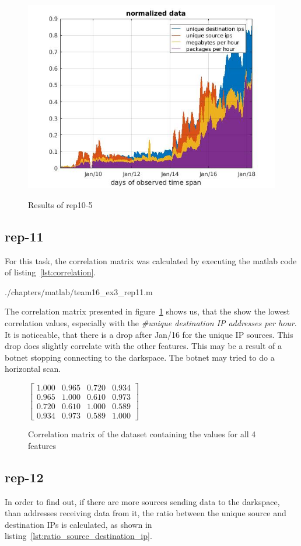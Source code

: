 \begin{figure}[H]
\center
\includegraphics[width=.5\textwidth]{./chapters/plots/rep10_5.jpg}\\
\caption{Results of rep10-5}
\end{figure}





\subsection*{rep-11}
For this task, the correlation matrix was calculated by executing the matlab code of listing~\ref{lst:correlation}.


				{./chapters/matlab/team16_ex3_rep11.m}

The correlation matrix presented in figure~\ref{fig:correlation} shows us, that the  show the lowest correlation values, especially with the \textit{\#unique destination IP addresses per hour}. It is noticeable, that there is a drop after Jan/16 for the unique IP sources. This drop does slightly correlate with the other features. This may be a result of a botnet stopping connecting to the darkspace. The botnet may tried to do a horizontal scan.

\begin{figure}[H]
\center
$
\begin{bmatrix}
1.000 &  0.965 &  0.720 &  0.934 \\
0.965 &  1.000 &  0.610 &  0.973 \\
0.720 &  0.610 &  1.000 &  0.589 \\
0.934 &  0.973 &  0.589 &  1.000
\end{bmatrix}
$
\caption{ Correlation matrix of the dataset containing the values for all 4 features }
\label{fig:correlation}
\end{figure}

\subsection*{rep-12}
In order to find out, if there are more sources sending data to the darkspace, than addresses receiving data from it, the ratio between the unique source and destination IPs is calculated, as shown in listing~\ref{lst:ratio_source_destination_ip}.

